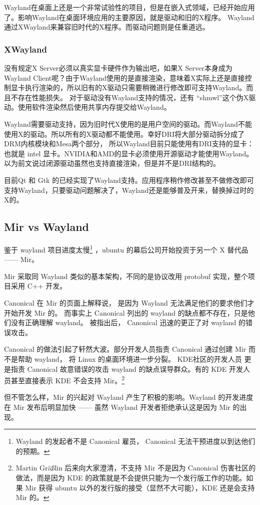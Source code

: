 Wayland在桌面上还是一个非常试验性的项目，但是在嵌入式领域，已经开始应用了。影响Wayland在桌面环境应用的主要原因，就是驱动和旧的X程序。
Wayland通过XWayland来兼容旧时代的X程序。而驱动问题则是任重道远。

\begin{insertnote}
\subsubsection*{XWayland}

没有规定X Server必须以真实显卡硬件作为输出吧，如果X Server本身成为Wayland Client呢？由于Wayland使用的是直接渲染，意味着X实际上还是直接控制显卡执行渲染的，所以旧有的X驱动只需要稍微进行修改即可支持Wayland。而且不存在性能损失。
对于驱动没有Wayland支持的情况，还有 “shmwl”这个伪X驱动。使用软件渲染然后使用共享内存提交给Wayland。

\end{insertnote}

Wayland需要驱动支持，因为旧时代X使用的是用户空间的驱动。而Wayland不能使用X的驱动。所以所有的X驱动都不能使用。幸好DRI将大部分驱动拆分成了DRM内核模块和Mesa两个部分，
所以Wayland目前只能使用有DRI支持的显卡：也就是 intel 显卡。NVIDIA和AMD的显卡必须使用开源驱动才能使用Wayland。以为前文说过闭源驱动虽然也支持直接渲染，但是并不是DRI结构的。

目前Qt 和 Gtk 的已经实现了Wayland支持。应用程序稍作修改甚至不做修改即可支持Wayland，只要驱动问题解决了，Wayland还是能够普及开来，替换掉过时的X的。

\begin{insertnote}

\subsection*{Mir vs Wayland}

鉴于 wayland 项目进度太慢\footnote{Wayland 的发起者不是 Canonical 雇员， Canonical 无法干预进度以到达他们的预期。} ，ubuntu 的幕后公司开始投资于另一个 X 替代品 —— Mir。

Mir 采取同 Wayland 类似的基本架构，不同的是协议改用 protobuf 实现，整个项目采用 C++ 开发。

Canonical 在 Mir 的页面上解释说， 是因为 Wayland 无法满足他们的要求他们才开始开发 Mir 的。
而事实上 Canonical 列出的 wayland 的缺点都不存在，只是他们没有正确理解 wayland。 
被指出后， Canonical 迅速的更正了对 wayland 的错误攻击。

Canonical 的做法引起了轩然大波。部分开发人员指责 Canonical 通过创建 Mir 而不是帮助 wayland， 将 Linux 的桌面环境进一步分裂。
KDE社区的开发人员 更是指责 Canonical 故意错误的攻击 wayland 的缺点误导群众。有的 KDE 开发人员甚至直接表示 KDE 不会支持 Mir。\footnote{Martin Gräßlin 后来向大家澄清，不支持 Mir 不是因为 Canonical 伤害社区的做法，而是因为 KDE 的政策就是不会提供只能为一个发行版工作的功能。如果 Mir 获得 ubuntu 以外的发行版的接受（显然不大可能），KDE 还是会支持 Mir 的。}


但不管怎么样，Mir 的兴起对 Wayland 产生了积极的影响。Wayland 的开发进度在 Mir 发布后明显加快 —— 虽然 Wayland 开发者拒绝承认这是因为 Mir 的出现。



\end{insertnote}